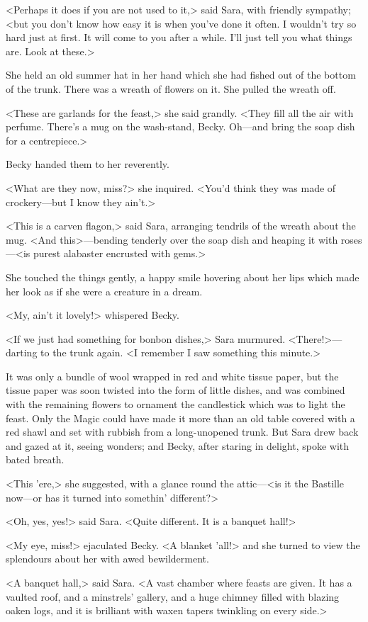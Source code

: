 <Perhaps it does if you are not used to it,> said Sara, with friendly sympathy; <but you don't know how easy it is when you've done it often. I wouldn't try so hard just at first. It will come to you after a while. I'll just tell you what things are. Look at these.>

She held an old summer hat in her hand which she had fished out of the bottom of the trunk. There was a wreath of flowers on it. She pulled the wreath off.

<These are garlands for the feast,> she said grandly. <They fill all the air with perfume. There's a mug on the wash-stand, Becky. Oh—and bring the soap dish for a centrepiece.>

Becky handed them to her reverently.

<What are they now, miss?> she inquired. <You'd think they was made of crockery—but I know they ain't.>

<This is a carven flagon,> said Sara, arranging tendrils of the wreath about the mug. <And this>—bending tenderly over the soap dish and heaping it with roses—<is purest alabaster encrusted with gems.>

She touched the things gently, a happy smile hovering about her lips which made her look as if she were a creature in a dream.

<My, ain't it lovely!> whispered Becky.

<If we just had something for bonbon dishes,> Sara murmured. <There!>—darting to the trunk again. <I remember I saw something this minute.>

It was only a bundle of wool wrapped in red and white tissue paper, but the tissue paper was soon twisted into the form of little dishes, and was combined with the remaining flowers to ornament the candlestick which was to light the feast. Only the Magic could have made it more than an old table covered with a red shawl and set with rubbish from a long-unopened trunk. But Sara drew back and gazed at it, seeing wonders; and Becky, after staring in delight, spoke with bated breath.

<This 'ere,> she suggested, with a glance round the attic—<is it the Bastille now—or has it turned into somethin' different?>

<Oh, yes, yes!> said Sara. <Quite different. It is a banquet hall!>

<My eye, miss!> ejaculated Becky. <A blanket 'all!> and she turned to view the splendours about her with awed bewilderment.

<A banquet hall,> said Sara. <A vast chamber where feasts are given. It has a vaulted roof, and a minstrels' gallery, and a huge chimney filled with blazing oaken logs, and it is brilliant with waxen tapers twinkling on every side.>

